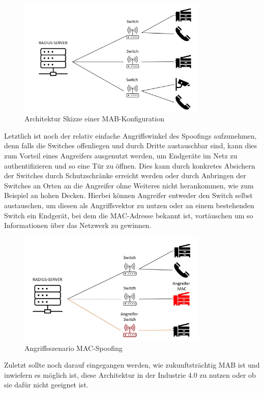 \documentclass[conference]{IEEEtran}
\begin{document}
\begin{figure}[hbt]
	\centering
	\includegraphics[width=9cm]{figures/Server_Switch.jpg}
	\caption{Architektur Skizze einer MAB-Konfiguration}
	\label{fig:mab_configuration}
\end{figure}
Letztlich ist noch der relativ einfache Angriffswinkel des Spoofings aufzunehmen, denn falls die Switches offenliegen und durch Dritte austauschbar sind, kann dies zum Vorteil eines Angreifers ausgenutzt werden, um Endgeräte im Netz zu authentifizieren und so eine Tür zu öffnen. Dies kann durch konkretes Absichern der Switches durch Schutzschränke erreicht werden oder durch Anbringen der Switches an Orten an die Angreifer ohne Weiteres nicht herankommen, wie zum Beispiel an hohen Decken. Hierbei können Angreifer entweder den Switch selbst austauschen, um diesen als Angriffsvektor zu nutzen oder an einem bestehenden Switch ein Endgerät, bei dem die MAC-Adresse bekannt ist, vortäuschen um so Informationen über das Netzwerk zu gewinnen.
\begin{figure}[hbt]
	\centering
	\includegraphics[width=9cm]{figures/Angriffsszenario_Spoofing.jpg}
	\caption{Angriffsszenario MAC-Spoofing}
	\label{fig:mac_spoofing}
\end{figure}

Zuletzt sollte noch darauf eingegangen werden, wie zukunftsträchtig MAB ist und inwiefern es möglich ist, diese Architektur in der Industrie 4.0 zu nutzen oder ob sie dafür nicht geeignet ist. 
\end{document}
